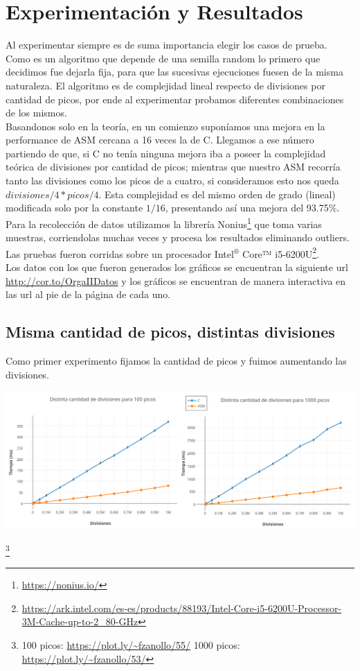 \section{Experimentación y Resultados}

Al experimentar siempre es de suma importancia elegir los casos de prueba. Como es un algoritmo que depende de una semilla random lo primero que decidimos fue dejarla fija, para que las sucesivas ejecuciones fuesen de la misma naturaleza. El algoritmo es de complejidad lineal respecto de divisiones por cantidad de picos, por ende al experimentar probamos diferentes combinaciones de los mismos.\\

Basandonos solo en la teoría, en un comienzo suponíamos una mejora en la performance de ASM cercana a 16 veces la de C. Llegamos a ese número partiendo de que, si C no tenía ninguna mejora iba a poseer la complejidad teórica de divisiones por cantidad de picos; mientras que nuestro ASM recorría tanto las divisiones como los picos de a cuatro, si consideramos esto nos queda $divisiones/4 * picos/4$. Esta complejidad es del mismo orden de grado (lineal) modificada solo por la constante $1/16$, presentando así una mejora del 93.75$\%$.\\

Para la recolección de datos utilizamos la librería Nonius\footnote{\url{https://nonius.io/}} que toma varias muestras, corriendolas muchas veces y procesa los resultados eliminando outliers. Las pruebas fueron corridas sobre un procesador Intel$^{®}$ Core™ i5-6200U\footnote{\url{https://ark.intel.com/es-es/products/88193/Intel-Core-i5-6200U-Processor-3M-Cache-up-to-2_80-GHz}}.\\

Los datos con los que fueron generados los gráficos se encuentran la siguiente url \url{http://cor.to/OrgaIIDatos} y los gráficos se encuentran de manera interactiva en las url al pie de la página de cada uno.

\subsection{Misma cantidad de picos, distintas divisiones}
Como primer experimento fijamos la cantidad de picos y fuimos aumentando las divisiones.

\centerline{\includegraphics[scale=0.45]{imagenes/distintasDivisionesParaPicos.png}}\footnote{ 100 picos: \url{https://plot.ly/~fzanollo/55/} 1000 picos: \url{https://plot.ly/~fzanollo/53/}} 

